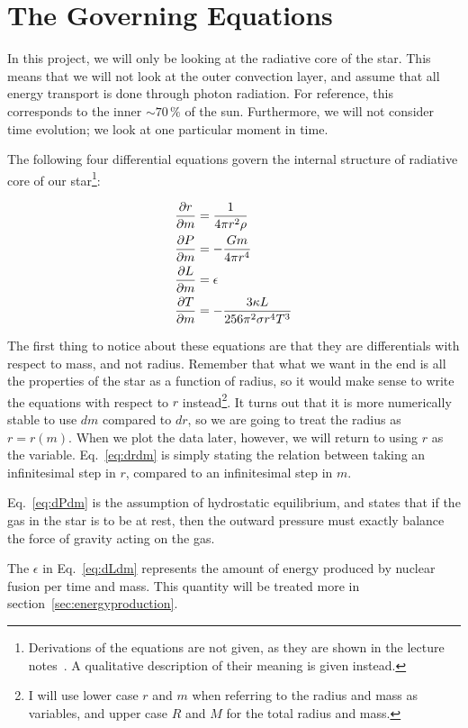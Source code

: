 \documentclass[11pt,twocolumn]{article}
\begin{document}
\section{The Governing Equations}
In this project, we will only be looking at the radiative core of the
star. This means that we will not look at the outer convection layer,
and assume that all energy transport is done through photon
radiation. For reference, this corresponds to the inner $\sim 70\,\%$ of the
sun. Furthermore, we will not consider time evolution; we look at one
particular moment in time. 

The following four differential equations govern the internal
structure of radiative core of our star\footnote{Derivations of the
  equations are not given, as they are shown in the lecture
  notes~\cite{lecture-notes}. A qualitative description of their
  meaning is given instead.}:

\begin{align}
  \frac{\partial r}{\partial m} &= \frac{ 1 }{ 4\pi r^2\rho }\label{eq:drdm}\\
  \frac{\partial P}{\partial m} &= - \frac{ Gm }{ 4\pi r^4 }\label{eq:dPdm}\\
  \frac{\partial L}{\partial m} &= \epsilon\label{eq:dLdm}\\
  \frac{\partial T}{\partial m} &= - \frac{ 3\kappa L }{ 256 \pi^2 \sigma r^4T^3 }\label{eq:dTdm}
\end{align}

The first thing to notice about these equations are that they are
differentials with respect to mass, and not radius. Remember that what
we want in the end is all the properties of the star as a function of
radius, so it would make sense to write the equations with respect to
$r$ instead\footnote{I will use lower case $r$ and $m$ when referring
  to the radius and mass as variables, and upper case $R$ and $M$ for
  the total radius and mass.}. It turns out that it is more numerically
stable to use $dm$ compared to $dr$, so we are going to treat the
radius as $r=r(m)$. When we plot the data later, however, we will
return to using $r$ as the variable. Eq.~\eqref{eq:drdm} is simply
stating the relation between taking an infinitesimal step in $r$,
compared to an infinitesimal step in $m$. 

Eq.~\eqref{eq:dPdm} is the assumption of hydrostatic equilibrium, and
states that if the gas in the star is to be at rest, then the outward
pressure must exactly balance the force of gravity acting on the gas. 

The $\epsilon$ in Eq.~\eqref{eq:dLdm} represents the amount of
energy produced by nuclear fusion per time and mass. This quantity
will be treated more in section~\ref{sec:energyproduction}.
\end{document}

